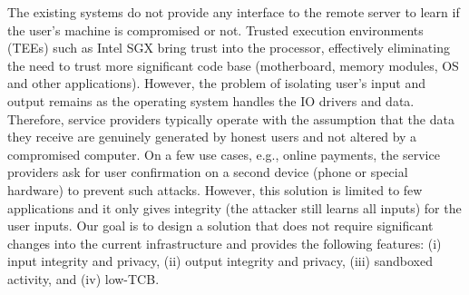 The existing systems do not provide any interface to the remote server to learn if the user's machine is compromised or not. Trusted execution environments (TEEs) such as Intel SGX bring trust into the processor, effectively eliminating the need to trust more significant code base (motherboard, memory modules, OS and other applications). However, the problem of isolating user's input and output remains as the operating system handles the IO drivers and data. Therefore, service providers typically operate with the assumption that the data they receive are genuinely generated by honest users and not altered by a compromised computer. On a few use cases, e.g., online payments, the service providers ask for user confirmation on a second device (phone or special hardware) to prevent such attacks. However, this solution is limited to few applications and it only gives integrity (the attacker still learns all inputs) for the user inputs. Our goal is to design a solution that does not require significant changes into the current infrastructure and provides the following features: (i) input integrity and privacy, (ii) output integrity and privacy, (iii) sandboxed activity, and (iv) low-TCB.


